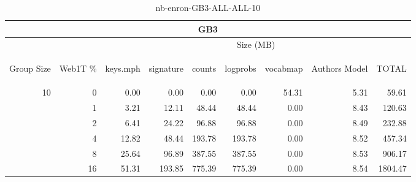 \begin{center}
\begin{table}[htbp] 
 \begin{center}
\begin{tabular}{ | r | r | r | r | r | r | r | r | r |}
\hline
\multicolumn{9}{|c|}{GB3}\\
\hline
 & & \multicolumn{7}{|c|}{Size (MB)}\\ \cline{3-9}
\begin{sideways}Group Size\end{sideways} & \begin{sideways}Web1T \% \end{sideways} & \begin{sideways}keys.mph\end{sideways} & \begin{sideways}signature\end{sideways} & \begin{sideways}counts\end{sideways} & \begin{sideways}logprobs\end{sideways} & \begin{sideways}vocabmap\end{sideways} & \begin{sideways}Authors Model \end{sideways} & \begin{sideways}TOTAL\end{sideways}\\
\hline
\multirow{5}{*}{10}
 & 0 & 0.00 & 0.00 & 0.00 & 0.00 & 54.31 & 5.31 & 59.61\\ \cline{2-9}
 & 1 & 3.21 & 12.11 & 48.44 & 48.44 & 0.00 & 8.43 & 120.63\\ \cline{2-9}
 & 2 & 6.41 & 24.22 & 96.88 & 96.88 & 0.00 & 8.49 & 232.88\\ \cline{2-9}
 & 4 & 12.82 & 48.44 & 193.78 & 193.78 & 0.00 & 8.52 & 457.34\\ \cline{2-9}
 & 8 & 25.64 & 96.89 & 387.55 & 387.55 & 0.00 & 8.53 & 906.17\\ \cline{2-9}
 & 16 & 51.31 & 193.85 & 775.39 & 775.39 & 0.00 & 8.54 & 1804.47\\ \cline{2-9}
\hline
\end{tabular}
\caption{nb-enron-GB3-ALL-ALL-10}
\label{table:nb-enron-GB3-ALL-ALL-10}
\end{center}
 \end{table}
\end{center}

